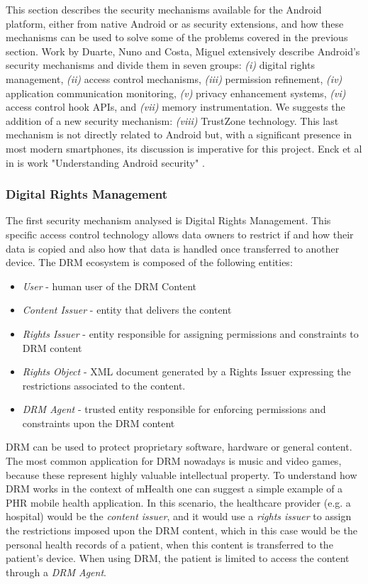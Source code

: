 This section describes the security mechanisms available for the Android platform, either from native Android or as security extensions, and how these mechanisms can be used to solve some of the problems covered in the previous section. Work by Duarte, Nuno \cite{nunoduarte} and Costa, Miguel \cite{miguelcosta} extensively describe Android's security mechanisms and divide them in seven groups: \emph{(i)} digital rights management, \emph{(ii)} access control mechanisms, \emph{(iii)} permission refinement, \emph{(iv)} application communication monitoring, \emph{(v)} privacy enhancement systems, \emph{(vi)} access control hook APIs, and \emph{(vii)} memory instrumentation. We suggests the addition of a new security mechanism: \emph{(viii)} TrustZone technology. This last mechanism is not directly related to Android but, with a significant presence in most modern smartphones, its discussion is imperative for this project. Enck et al in is work "Understanding Android security" \cite{enck2009understanding}.%

\subsubsection{Digital Rights Management}
The first security mechanism analysed is Digital Rights Management. This specific access control technology allows data owners to restrict if and how their data is copied and also how that data is handled once transferred to another device. The \ac{DRM} ecosystem is composed of the following entities:

\begin{itemize}
	\item \emph{User} - human user of the DRM Content
	\item \emph{Content Issuer} - entity that delivers the content
	\item \emph{Rights Issuer} - entity responsible for assigning permissions and constraints to \ac{DRM} content
	\item \emph{Rights Object} - XML document generated by a Rights Issuer expressing the restrictions associated to the content.
	\item \emph{\ac{DRM} Agent} - trusted entity responsible for enforcing permissions and constraints upon the \ac{DRM} content
\end{itemize}

\ac{DRM} can be used to protect proprietary software, hardware or general content. The most common application for \ac{DRM} nowadays is music and video games, because these represent highly valuable intellectual property. To understand how \ac{DRM} works in the context of mHealth one can suggest a simple example of a \ac{PHR} mobile health application. In this scenario, the healthcare provider (e.g. a hospital) would be the \emph{content issuer}, and it would use a \emph{rights issuer} to assign the restrictions imposed upon the \ac{DRM} content, which in this case would be the personal health records of a patient, when this content is transferred to the patient's device. When using \ac{DRM}, the patient is limited to access the content through a \emph{\ac{DRM} Agent}.

